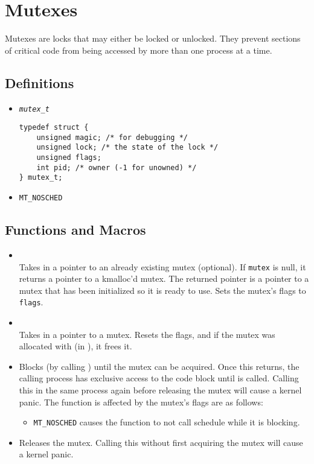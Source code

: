 \section{Mutexes}

Mutexes are locks that may either be locked or unlocked. They prevent sections of
critical code from being accessed by more than one process at a time.

\subsection{Definitions}
\begin{itemize}

\item \texttt{\textit{mutex\_t}} 
\begin{lstlisting}
typedef struct {
	unsigned magic; /* for debugging */
	unsigned lock; /* the state of the lock */
	unsigned flags;
	int pid; /* owner (-1 for unowned) */
} mutex_t;
\end{lstlisting}

\item \texttt{MT\_NOSCHED}

\end{itemize}

\subsection{Functions and Macros}
\begin{itemize}
\item {} \\
Takes in a pointer to an already existing mutex (optional). If \texttt{mutex} is 
null, it returns a pointer to a kmalloc'd mutex. The returned pointer
is a pointer to a mutex that has been initialized so it is ready to use. Sets the mutex's flags
to \texttt{flags}.

\item {} \\
Takes in a pointer to a mutex. Resets the flags, and if the mutex was allocated
with  (in ), it frees it.
\item {} 
Blocks (by calling ) until the mutex can be acquired. Once this returns,
the calling process has exclusive access to the code block until  is called.
Calling this in the same process again before releasing the mutex will cause a kernel panic.
The function is affected by the mutex's flags are as follows:
\begin{itemize}
\item \texttt{MT\_NOSCHED} causes the function to not call schedule while it is blocking.
\end{itemize}
\item {} 
Releases the mutex. Calling this without first acquiring the mutex will cause a kernel panic.
\end{itemize}
